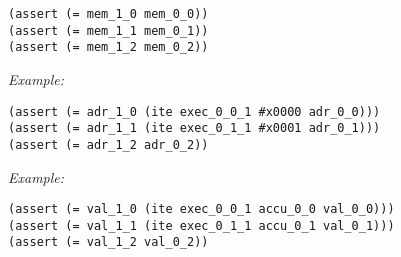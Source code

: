 \vspace{-\baselineskip/2}

\begin{lstlisting}[style=smtlib]
(assert (= mem_1_0 mem_0_0))
(assert (= mem_1_1 mem_0_1))
(assert (= mem_1_2 mem_0_2))
\end{lstlisting}



\noindent
\emph{Example:} 

\vspace{-\baselineskip/2}

\begin{lstlisting}[style=smtlib]
(assert (= adr_1_0 (ite exec_0_0_1 #x0000 adr_0_0)))
(assert (= adr_1_1 (ite exec_0_1_1 #x0001 adr_0_1)))
(assert (= adr_1_2 adr_0_2))
\end{lstlisting}



\noindent
\emph{Example:} 

\vspace{-\baselineskip/2}

\begin{lstlisting}[style=smtlib]
(assert (= val_1_0 (ite exec_0_0_1 accu_0_0 val_0_0)))
(assert (= val_1_1 (ite exec_0_1_1 accu_0_1 val_0_1)))
(assert (= val_1_2 val_0_2))
\end{lstlisting}

